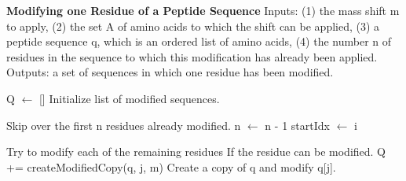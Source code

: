 \documentclass[12pt]{article}
\begin{document}
\begin{algorithm}
\caption{{\bf Modifying one Residue of a Peptide Sequence} Inputs: (1)
  the mass shift m to apply, (2) the set A of amino acids to which the
  shift can be applied, (3) a peptide sequence q, which is an ordered
  list of amino acids, (4) the number n of residues in the sequence to
  which this modification has already been applied.  Outputs: a set
  of sequences in which one residue has been modified.
  \label{algorithm:apply}} 
\begin{algorithmic}[1]

  \State Q $\gets$ []
  \Comment Initialize list of modified sequences.

  \Comment Skip over the first n residues already modified.
      \State n $\gets$ n - 1
    \EndIf
      \State startIdx $\gets$ i
    \EndIf
  \EndFor

  \Comment Try to modify each of the remaining residues
    \Comment If the residue can be modified.
      \State Q += createModifiedCopy(q, j, m)
      \Comment Create a copy of q and modify q[j].
    \EndIf
  \EndFor

  \State {}

\EndProcedure
\end{algorithmic}
\end{algorithm}
\end{document}
